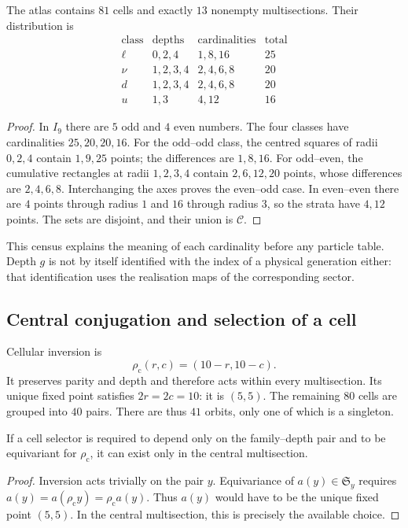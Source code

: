 \begin{proposition}
\label{vi:prop:censo13}
The atlas contains \(81\) cells and exactly \(13\) nonempty multisections.
Their distribution is
\[
\begin{array}{c|c|c|r}
\text{class}&\text{depths}&\text{cardinalities}&\text{total}\\\hline
\ell&0,2,4&1,8,16&25\\
\nu&1,2,3,4&2,4,6,8&20\\
d&1,2,3,4&2,4,6,8&20\\
u&1,3&4,12&16
\end{array}
\]
\end{proposition}
\begin{proof}
In \(I_9\) there are \(5\) odd and \(4\) even numbers. The four classes have
cardinalities \(25,20,20,16\). For the odd--odd class, the centred squares
of radii \(0,2,4\) contain \(1,9,25\) points; the
differences are \(1,8,16\). For odd--even, the cumulative rectangles
at radii \(1,2,3,4\) contain \(2,6,12,20\) points, whose
differences are \(2,4,6,8\). Interchanging the axes proves the
even--odd case. In even--even there are \(4\) points through radius \(1\) and \(16\)
through radius \(3\), so the strata have \(4,12\) points.
The sets are disjoint, and their union is \(\mathcal C\).
\end{proof}

This census explains the meaning of each cardinality before any particle
table. Depth \(g\) is not by itself identified with the index of a
physical generation either: that identification uses the realisation
maps of the corresponding sector.

\subsection{Central conjugation and selection of a cell}

Cellular inversion is
\[
 \rho_{\mathrm c}(r,c)=(10-r,10-c).
\]
It preserves parity and depth and therefore acts within every
multisection. Its unique fixed point satisfies \(2r=2c=10\): it is \((5,5)\).
The remaining \(80\) cells are grouped into \(40\) pairs. There are thus
\(41\) orbits, only one of which is a singleton.

\begin{proposition}
If a cell selector is required to depend only on the family--depth pair
and to be equivariant for \(\rho_{\mathrm c}\), it can exist
only in the central multisection.
\end{proposition}
\begin{proof}
Inversion acts trivially on the pair \(y\). Equivariance of
\(a(y)\in\mathfrak S_y\) requires
\(a(y)=a(\rho_{\mathrm c}y)=\rho_{\mathrm c}a(y)\).
Thus \(a(y)\) would have to be the unique fixed point \((5,5)\).
In the central multisection, this is precisely the available choice.
\end{proof}

